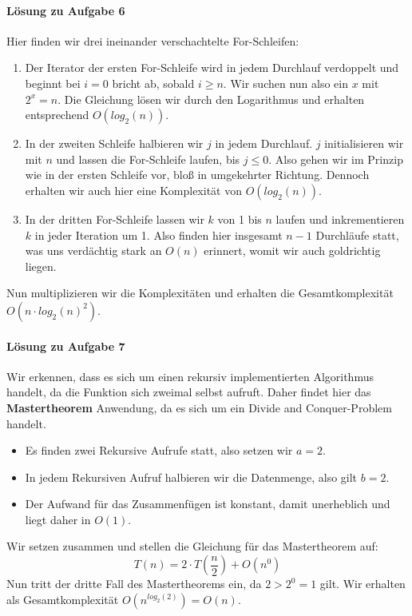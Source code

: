 \documentclass[11pt,a4paper]{scrartcl}
\begin{document}
\paragraph{Lösung zu Aufgabe 6} \label{a1.6:lsg}
Hier finden wir drei ineinander verschachtelte For-Schleifen:
\begin{enumerate}
\item Der Iterator der ersten For-Schleife wird in jedem Durchlauf verdoppelt und beginnt bei $i = 0$ bricht ab, sobald $i \geq n$. Wir suchen nun also ein $x$ mit $2^x = n$. Die Gleichung lösen wir durch den Logarithmus und erhalten entsprechend $O(log_{2}(n))$.
\item In der zweiten Schleife halbieren wir $j$ in jedem Durchlauf. $j$ initialisieren wir mit $n$ und lassen die For-Schleife laufen, bis $j \leq 0$. Also gehen wir im Prinzip wie in der ersten Schleife vor, bloß in umgekehrter Richtung. Dennoch erhalten wir auch hier eine Komplexität von $O(log_{2}(n))$.
\item In der dritten For-Schleife lassen wir $k$ von 1 bis $n$ laufen und inkrementieren $k$ in jeder Iteration um 1. Also finden hier insgesamt $n-1$ Durchläufe statt, was uns verdächtig stark an $O(n)$ erinnert, womit wir auch goldrichtig liegen. 
\end{enumerate}
Nun multiplizieren wir die Komplexitäten und erhalten die Gesamtkomplexität $O(n \cdot log_{2}(n)^2)$.
\paragraph{Lösung zu Aufgabe 7} \label{a1.7:lsg}
Wir erkennen, dass es sich um einen rekursiv implementierten Algorithmus handelt, da die Funktion sich zweimal selbst aufruft. Daher findet hier das \textbf{Mastertheorem} Anwendung, da es sich um ein {\glqq}Divide and Conquer{\grqq}-Problem handelt.
\begin{itemize}
\item Es finden zwei Rekursive Aufrufe statt, also setzen wir $a = 2$.
\item In jedem Rekursiven Aufruf halbieren wir die Datenmenge, also gilt $b = 2$.
\item Der Aufwand für das Zusammenfügen ist konstant, damit unerheblich und liegt daher in $O(1)$.
\end{itemize}
Wir setzen zusammen und stellen die Gleichung für das Mastertheorem auf:
\[T(n) = 2 \cdot T(\frac{n}{2}) + O(n^0)\]
Nun tritt der dritte Fall des Mastertheorems ein, da $2 > 2^0 = 1$ gilt. Wir erhalten als Gesamtkomplexität $O(n^{log_2(2)}) = O(n)$.
\end{document}
